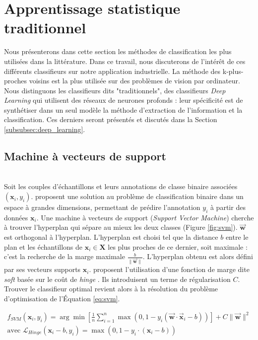 \section{Apprentissage statistique traditionnel}
Nous présenterons dans cette section les méthodes de classification les plus utilisées dans la littérature.
Dans ce travail, nous discuterons de l'intérêt de ces différents classifieurs sur notre application industrielle.
La méthode des k-plus-proches voisins est la plus utilisée sur des problèmes de vision par ordinateur.
Nous distinguons les classifieurs dits "traditionnels", des classifieurs \textit{Deep Learning} qui utilisent des réseaux de neurones profonds : leur spécificité est de synthétiser dans un seul modèle la méthode d'extraction de l'information et la classification.
Ces derniers seront présentés et discutés dans la Section \ref{subsubsec:deep_learning}.

\subsection{Machine à vecteurs de support}\mbox{\label{parag:svm}} \\
Soit les couples d'échantillons et leurs annotations de classe binaire associées $(\mathbf{x}_i, y_i)$.
\citeauthor{vapnik_patterns_1963} \cite{vapnik_patterns_1963} proposent une solution au problème de classification binaire dans un espace à grandes dimensions, permettant de prédire l'annotation $y_i$ à partir des données $\mathbf{x}_i$.
Une machine à vecteurs de support (\textit{Support Vector Machine}) cherche à trouver l'hyperplan qui sépare au mieux les deux classes (Figure \ref{fig:svm}). $\vec{\mathbf{w}}$  est orthogonal à l'hyperplan.
L'hyperplan est choisi tel que la distance $b$ entre le plan et les échantillons de $\mathbf{x}_i \in \mathbf{X}$ les plus proches de ce dernier, soit maximale : c'est la recherche de la marge maximale $\frac{b}{\|\vec{\mathbf{w}}\|}$.
L'hyperplan obtenu est alors défini par ses vecteurs supports $\mathbf{x}_i$.
\citeauthor{cortes_supportvector_1995} proposent l'utilisation d'une fonction de marge dite \textit{soft} basée sur le coût de \textit{hinge} \cite{cortes_supportvector_1995, vapnik_support_1997}.
Ils introduisent un terme de régularisation $C$. Trouver le classifieur optimal revient alors à la résolution du problème d'optimisation de l'Équation \ref{eq:svm}.

\begin{equation} \label{eq:svm}
\begin{split}
f_{SVM}(\mathbf{x}_i, y_i) = \arg \min \left[\frac{1}{n} \sum_{i=1}^{n} \max \left(0, 1-y_{i}\left(\vec{\mathbf{w}} \cdot \vec{\mathbf{x}}_{i}-b\right)\right)\right]+ C \|\vec{\mathbf{w}}\|^{2}
\\
\text{avec } \mathcal{L}_{Hinge}(\mathbf{x}_i-b, y_i) = \max (0, 1 - y_i \cdot (\mathbf{x}_i-b))
\end{split}
\end{equation}

